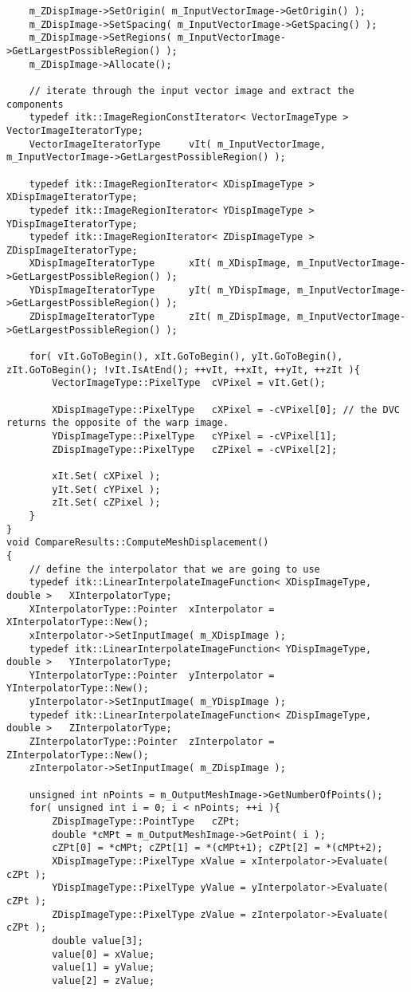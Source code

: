 \begin{lstlisting}
	m_ZDispImage->SetOrigin( m_InputVectorImage->GetOrigin() );
	m_ZDispImage->SetSpacing( m_InputVectorImage->GetSpacing() );
	m_ZDispImage->SetRegions( m_InputVectorImage->GetLargestPossibleRegion() );
	m_ZDispImage->Allocate();
	
	// iterate through the input vector image and extract the components
	typedef itk::ImageRegionConstIterator< VectorImageType >		VectorImageIteratorType;
	VectorImageIteratorType		vIt( m_InputVectorImage, m_InputVectorImage->GetLargestPossibleRegion() );
	
	typedef itk::ImageRegionIterator< XDispImageType >				XDispImageIteratorType;
	typedef itk::ImageRegionIterator< YDispImageType >				YDispImageIteratorType;
	typedef itk::ImageRegionIterator< ZDispImageType >				ZDispImageIteratorType;
	XDispImageIteratorType		xIt( m_XDispImage, m_InputVectorImage->GetLargestPossibleRegion() );
	YDispImageIteratorType		yIt( m_YDispImage, m_InputVectorImage->GetLargestPossibleRegion() );
	ZDispImageIteratorType		zIt( m_ZDispImage, m_InputVectorImage->GetLargestPossibleRegion() );
	
	for( vIt.GoToBegin(), xIt.GoToBegin(), yIt.GoToBegin(), zIt.GoToBegin(); !vIt.IsAtEnd(); ++vIt, ++xIt, ++yIt, ++zIt ){
		VectorImageType::PixelType	cVPixel = vIt.Get();
		
		XDispImageType::PixelType	cXPixel = -cVPixel[0]; // the DVC returns the opposite of the warp image.
		YDispImageType::PixelType	cYPixel = -cVPixel[1];
		ZDispImageType::PixelType	cZPixel = -cVPixel[2];
		
		xIt.Set( cXPixel );
		yIt.Set( cYPixel );
		zIt.Set( cZPixel );
	}
}
void CompareResults::ComputeMeshDisplacement()
{
	// define the interpolator that we are going to use
	typedef itk::LinearInterpolateImageFunction< XDispImageType, double >	XInterpolatorType;
	XInterpolatorType::Pointer	xInterpolator = XInterpolatorType::New();
	xInterpolator->SetInputImage( m_XDispImage );
	typedef itk::LinearInterpolateImageFunction< YDispImageType, double >	YInterpolatorType;
	YInterpolatorType::Pointer	yInterpolator = YInterpolatorType::New();
	yInterpolator->SetInputImage( m_YDispImage );
	typedef itk::LinearInterpolateImageFunction< ZDispImageType, double >	ZInterpolatorType;
	ZInterpolatorType::Pointer	zInterpolator = ZInterpolatorType::New();
	zInterpolator->SetInputImage( m_ZDispImage );
	
	unsigned int nPoints = m_OutputMeshImage->GetNumberOfPoints();
	for( unsigned int i = 0; i < nPoints; ++i ){
		ZDispImageType::PointType	cZPt;
		double *cMPt = m_OutputMeshImage->GetPoint( i );
		cZPt[0] = *cMPt; cZPt[1] = *(cMPt+1); cZPt[2] = *(cMPt+2);
		XDispImageType::PixelType xValue = xInterpolator->Evaluate( cZPt );
		YDispImageType::PixelType yValue = yInterpolator->Evaluate( cZPt );
		ZDispImageType::PixelType zValue = zInterpolator->Evaluate( cZPt );
		double value[3];
		value[0] = xValue;
		value[1] = yValue;
		value[2] = zValue;
		

\end{lstlisting}

